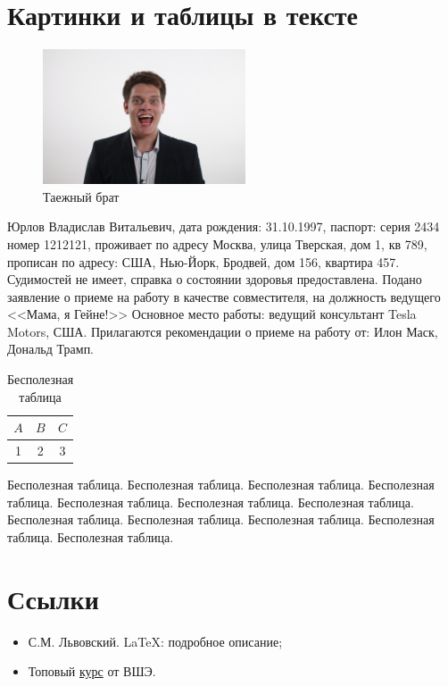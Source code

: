 \documentclass[a4paper,12pt]{article} %
\begin{document}
\section{Картинки и таблицы в тексте}
\begin{figure}
\includegraphics[width=6cm]{brat}
\caption{Таежный брат}
\end{figure} Юрлов Владислав Витальевич, дата рождения: 31.10.1997, паспорт: серия 2434 номер 1212121, проживает по адресу Москва, улица Тверская, дом 1, кв 789, прописан по адресу: США, Нью-Йорк, Бродвей, дом 156, квартира 457. Судимостей не имеет, справка о состоянии здоровья предоставлена. Подано заявление о приеме на работу в качестве совместителя, на должность ведущего <<Мама, я Гейне!>> Основное место работы: ведущий консультант Tesla Motors, США. Прилагаются рекомендации о приеме на работу от: Илон Маск, Дональд Трамп. 

\begin{table}
\begin{tabular}{|c|c|c|}
\hline 
$A$ & $B$ & $C$ \\ 
\hline 
1 & 2 & 3 \\ 
\hline 
\end{tabular} 
\caption{Бесполезная таблица}
\end{table} Бесполезная таблица. Бесполезная таблица. Бесполезная таблица. Бесполезная таблица. Бесполезная таблица. Бесполезная таблица. Бесполезная таблица. Бесполезная таблица. Бесполезная таблица. Бесполезная таблица. Бесполезная таблица. Бесполезная таблица. 

\listoffigures
\listoftables

\section{Ссылки}

\begin{itemize}
\item С.М. Львовский. \LaTeX : подробное описание;
\item Топовый \href{https://www.coursera.org/learn/latex}{курс} от ВШЭ.
\end{itemize}
\end{document}
